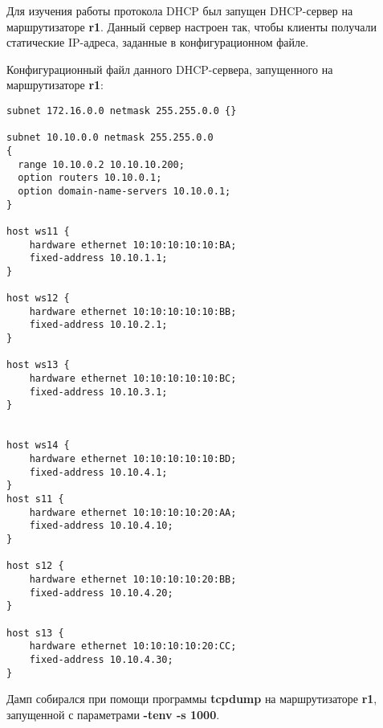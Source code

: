 \documentclass[a4paper,12pt]{article}
\begin{document}
Для изучения работы протокола DHCP был запущен DHCP-сервер на маршрутизаторе \textbf{r1}. Данный сервер настроен так, чтобы клиенты получали статические IP-адреса, заданные в конфигурационном файле.

Конфигурационный файл данного DHCP-сервера, запущенного на маршрутизаторе \textbf{r1}:
\begin{Verbatim}
subnet 172.16.0.0 netmask 255.255.0.0 {}

subnet 10.10.0.0 netmask 255.255.0.0
{
  range 10.10.0.2 10.10.10.200;
  option routers 10.10.0.1;
  option domain-name-servers 10.10.0.1;
}

host ws11 {
    hardware ethernet 10:10:10:10:10:BA;
    fixed-address 10.10.1.1;
}

host ws12 {
    hardware ethernet 10:10:10:10:10:BB;
    fixed-address 10.10.2.1;
}

host ws13 {
    hardware ethernet 10:10:10:10:10:BC;
    fixed-address 10.10.3.1;
}


host ws14 {
    hardware ethernet 10:10:10:10:10:BD;
    fixed-address 10.10.4.1;
}
host s11 {
    hardware ethernet 10:10:10:10:20:AA;
    fixed-address 10.10.4.10;
}

host s12 {
    hardware ethernet 10:10:10:10:20:BB;
    fixed-address 10.10.4.20;
}

host s13 {
    hardware ethernet 10:10:10:10:20:CC;
    fixed-address 10.10.4.30;
}
\end{Verbatim}

Дамп собирался при помощи программы \textbf{tcpdump} на маршрутизаторе \textbf{r1}, запущенной с параметрами \textbf{-tenv -s 1000}.
\end{document}
